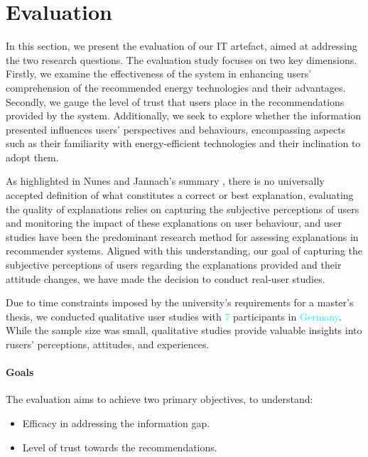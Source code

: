 \chapter{Evaluation}

In this section, we present the evaluation of our IT artefact, aimed at addressing the two research questions.
The evaluation study focuses on two key dimensions. 
Firstly, we examine the effectiveness of the system in enhancing users' comprehension of the recommended energy technologies and their advantages. 
Secondly, we gauge the level of trust that users place in the recommendations provided by the system. 
Additionally, we seek to explore whether the information presented influences users' perspectives and behaviours, 
encompassing aspects such as their familiarity with energy-efficient technologies and their inclination to adopt them. 

As highlighted in Nunes and Jannach's summary \cite{Nunes2020}, 
there is no universally accepted definition of what constitutes a correct or best explanation, 
evaluating the quality of explanations relies on capturing the subjective perceptions of users and monitoring the impact of these explanations on user behaviour, 
and user studies have been the predominant research method for assessing explanations in recommender systems.
Aligned with this understanding, our goal of capturing the subjective perceptions of users regarding the explanations provided and their attitude changes, 
we have made the decision to conduct real-user studies. 

Due to time constraints imposed by the university's requirements for a master's thesis, we conducted qualitative user studies with \textcolor{cyan}{7} participants in \textcolor{cyan}{Germany}. 
While the sample size was small, qualitative studies provide valuable insights into rusers' perceptions, attitudes, and experiences.


\subsubsection{Goals}

The evaluation aims to achieve two primary objectives, to understand: 
\begin{itemize}
  \item Efficacy in addressing the information gap.
  \item Level of trust towards the recommendations.
\end{itemize}


